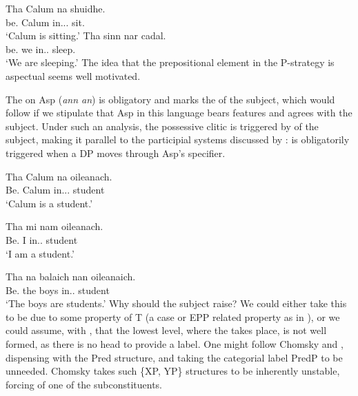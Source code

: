 \documentclass[output=paper]{langsci/langscibook}
\begin{document}
\ea {}
\sn\gll Tha Calum na shuidhe. \\
be.\Prs{} Calum in.\Poss.\Tsg.\M{} sit.\Vn{}\\
\glt \enquote*{Calum is sitting.}
\z
\ea {}
\sn\gll Tha sinn nar cadal. \\
be.\Prs{} we in.\Poss.\Fpl{} sleep.\Vn{}\\
\glt \enquote*{We are sleeping.}
\z
The idea that the prepositional element in the P-strategy is aspectual seems
well motivated.

The  on Asp (\emph{ann an}) is obligatory and marks the
 of the subject, which would follow if we stipulate that Asp in this
language bears  features and agrees with the subject. Under such
an analysis, the possessive clitic is  triggered by
 of the subject, making it parallel to the 
participial  systems discussed by \citet{kayne93}:
 is obligatorily triggered when a DP moves through Asp's
specifier.\newpage

\ea {}
\z

\ea {}
\sn
\gll Tha  Calum na oileanach.\\
Be.\Prs{}  Calum  in.\Poss.\Tsg.\M{}  student \\
\glt \enquote*{Calum is a student.}
\z

\ea {}
\sn
\gll Tha  mi  nam  oileanach.\\
Be.\Prs{}  I  in.\Poss.\Fsg{}  student \\
\glt \enquote*{I am a student.}
\z

\ea {}
\sn
\gll Tha  na balaich nan  oileanaich.\\
Be.\Prs{}  the boys  in.\Poss.\Tpl{}  student \\
\glt \enquote*{The boys are students.}
\z
Why should the subject raise? We could either take this to be due to some
property of T (a case or \gls{EPP} related property as in
\citet{roberts-roussou:02}), or we could assume, with \citet{Chomsky2013}, that
the lowest level, where the  takes place, is not well formed, as
there is no head to provide a label. One might follow Chomsky and
\citet{moro:97}, dispensing with the Pred structure, and taking the categorial
label PredP to be unneeded. Chomsky takes such \{XP, YP\} structures to be
inherently unstable, forcing  of one of the
subconstituents.
\end{document}
